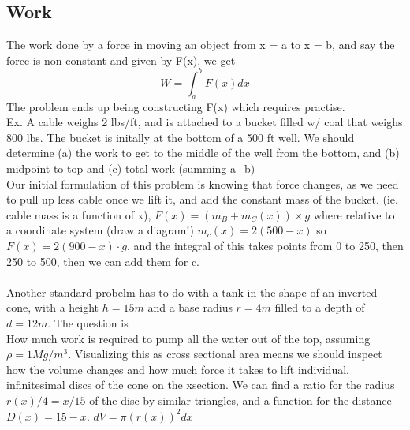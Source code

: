 \documentclass[twocolumn, 12pt]{report}
\begin{document}
\subsection{Work}
The work done by a force in moving an object from x = a to x = b, and say the force is non constant and given by F(x), we get $$W  = \int_a^b F(x)dx$$
The problem ends up being constructing F(x) which requires practise. \\
Ex. A cable weighs 2 lbs/ft, and is attached to a bucket filled w/ coal that weighs 800 lbs. The bucket is initally at the bottom of a 500 ft well. We should determine (a) the work to get to the middle of the well from the bottom, and (b) midpoint to top and (c) total work (summing a+b) \\ Our initial formulation of this problem is knowing that force changes, as we need to pull up less cable once we lift it, and add the constant mass of the bucket. (ie. cable mass is a function of x), $F(x) = (m_B + m_C (x)) \times g $ where relative to a coordinate system (draw a diagram!) $m_c (x) = 2 (500-x)$ so $F(x) = 2(900-x)\cdot g$, and the integral of this takes points from 0 to 250, then 250 to 500, then we can add them for c.\\\\
Another standard probelm has to do with a tank in the shape of an inverted cone, with a height $h = 15m$ and a base radius $r = 4m$ filled to a depth of $d = 12 m$. The question is \\How much work is required to pump all the water out of the top, assuming $\rho = 1 Mg/m^3$. Visualizing this as cross sectional area means we should inspect how the volume changes and how much force it takes to lift individual, infinitesimal discs of the cone on the xsection. We can find a ratio for the radius $r(x)/4 = x/15$ of the disc by similar triangles, and a function for the distance $D(x) = 15 - x$. $dV = \pi(r(x))^2 dx$
\end{document}
